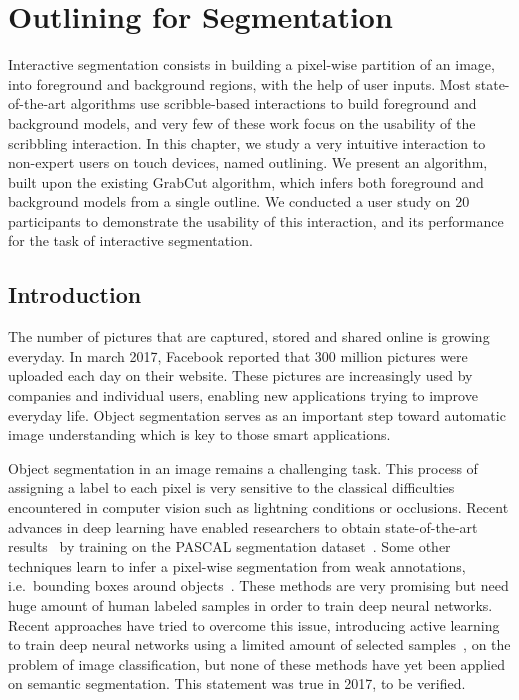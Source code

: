 \chapter{Outlining for Segmentation}%
\label{cha:contribution_outlining}

\minitoc%

\newpage%

Interactive segmentation consists in building a pixel-wise partition
of an image, into foreground and background regions,
with the help of user inputs.
Most state-of-the-art algorithms use scribble-based interactions
to build foreground and background models,
and very few of these work focus on the usability of
the scribbling interaction.
In this chapter, we study a very intuitive interaction
to non-expert users on touch devices, named outlining.
We present an algorithm, built upon the existing GrabCut algorithm,
which infers both foreground and background models from a single outline.
We conducted a user study on 20 participants
to demonstrate the usability of this interaction,
and its performance for the task of interactive segmentation.


\section{Introduction}


The number of pictures that are captured,
stored and shared online is growing everyday.
In march 2017, Facebook reported that 300 million pictures
were uploaded each day on their website.
These pictures are increasingly used by companies
and individual users, enabling new applications
trying to improve everyday life.
Object segmentation serves as an important step
toward automatic image understanding which is key
to those smart applications.


Object segmentation in an image remains a challenging task.
This process of assigning a label to each pixel is very sensitive
to the classical difficulties encountered in computer vision
such as lightning conditions or occlusions.
Recent advances in deep learning have enabled researchers to obtain
state-of-the-art results~\cite{long2015fully} by training
on the PASCAL segmentation dataset~\cite{everingham2010pascal}.
Some other techniques learn to infer a pixel-wise segmentation
from weak annotations, i.e.\ bounding boxes around
objects~\cite{papandreou2015weakly}.
These methods are very promising but need huge amount of human labeled
samples in order to train deep neural networks.
Recent approaches have tried to overcome this issue,
introducing active learning to train deep neural networks
using a limited amount of selected samples~\cite{liu2017active},
on the problem of image classification, but none of these methods
have yet been applied on semantic segmentation.
\alert{This statement was true in 2017, to be verified.}


